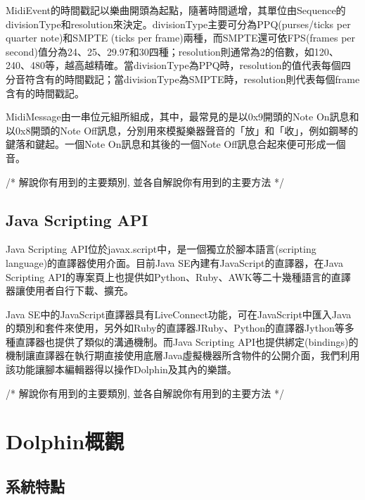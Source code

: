 \documentclass[12pt,a4paper,oneside]{report}
\begin{document}
MidiEvent的時間戳記以樂曲開頭為起點，隨著時間遞增，其單位由Sequence的divisionType和resolution來決定。divisionType主要可分為PPQ(purses/ticks per quarter note)和SMPTE (ticks per frame)兩種，而SMPTE還可依FPS(frames per second)值分為24、25、29.97和30四種；resolution則通常為2的倍數，如120、240、480等，越高越精確。當divisionType為PPQ時，resolution的值代表每個四分音符含有的時間戳記；當divisionType為SMPTE時，resolution則代表每個frame含有的時間戳記。

MidiMessage由一串位元組所組成，其中，最常見的是以0x9開頭的Note On訊息和以0x8開頭的Note Off訊息，分別用來模擬樂器聲音的「放」和「收」，例如鋼琴的鍵落和鍵起。一個Note On訊息和其後的一個Note Off訊息合起來便可形成一個音。

/*
     解說你有用到的主要類別, 並各自解說你有用到的主要方法
*/

\section{Java Scripting API}

Java Scripting API位於javax.script中，是一個獨立於腳本語言(scripting language)的直譯器使用介面。目前Java SE內建有JavaScript的直譯器，在Java Scripting API的專案頁上也提供如Python、Ruby、AWK等二十幾種語言的直譯器讓使用者自行下載、擴充。

Java SE中的JavaScript直譯器具有LiveConnect功能，可在JavaScript中匯入Java的類別和套件來使用，另外如Ruby的直譯器JRuby、Python的直譯器Jython等多種直譯器也提供了類似的溝通機制。而Java Scripting API也提供綁定(bindings)的機制讓直譯器在執行期直接使用底層Java虛擬機器所含物件的公開介面，我們利用該功能讓腳本編輯器得以操作Dolphin及其內的樂譜。

/*
     解說你有用到的主要類別, 並各自解說你有用到的主要方法
*/


\chapter{Dolphin概觀}

\section{系統特點}
\end{document}
